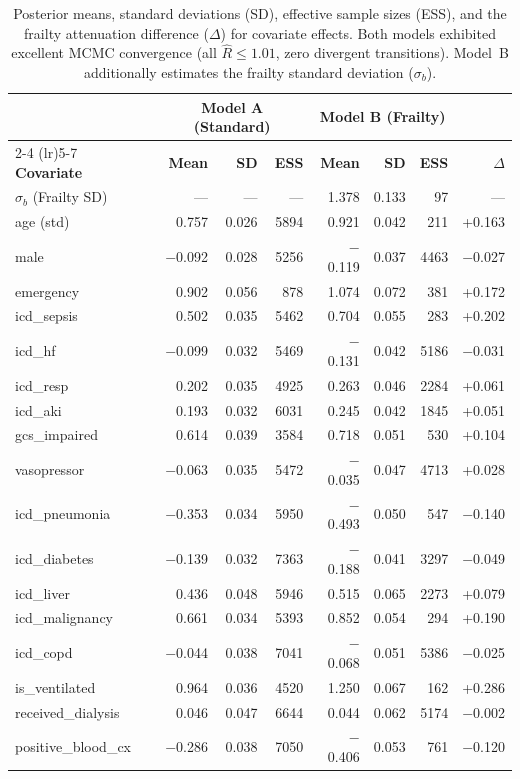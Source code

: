 \documentclass[twoside,11pt]{article}
\begin{document}
\begin{table}[ht!]
\centering
\scriptsize %
\setlength{\tabcolsep}{4pt} %
\renewcommand{\arraystretch}{0.95} %
\caption{Posterior means, standard deviations (SD), effective sample sizes (ESS), and the frailty attenuation difference ($\Delta$) for covariate effects. Both models exhibited excellent MCMC convergence (all $\hat{R} \le 1.01$, zero divergent transitions). Model~B additionally estimates the frailty standard deviation ($\sigma_b$).}
\label{tab:master_results}
\begin{tabular}{l rrr rrr r}
\toprule
 & \multicolumn{3}{c}{\textbf{Model A (Standard)}} & \multicolumn{3}{c}{\textbf{Model B (Frailty)}} & \\
\cmidrule(lr){2-4} \cmidrule(lr){5-7}
\textbf{Covariate} & \textbf{Mean} & \textbf{SD} & \textbf{ESS} & \textbf{Mean} & \textbf{SD} & \textbf{ESS} & \textbf{$\Delta$} \\
\midrule
$\sigma_b$ (Frailty SD) & --- & --- & --- & 1.378 & 0.133 & 97 & ---\\[2pt]
\midrule
age (std) & 0.757 & 0.026 & 5894 & 0.921 & 0.042 & 211 & +0.163 \\
male & $-$0.092 & 0.028 & 5256 & $-$0.119 & 0.037 & 4463 & $-$0.027 \\
emergency & 0.902 & 0.056 & 878 & 1.074 & 0.072 & 381 & +0.172 \\
icd\_sepsis & 0.502 & 0.035 & 5462 & 0.704 & 0.055 & 283 & +0.202 \\
icd\_hf & $-$0.099 & 0.032 & 5469 & $-$0.131 & 0.042 & 5186 & $-$0.031 \\
icd\_resp & 0.202 & 0.035 & 4925 & 0.263 & 0.046 & 2284 & +0.061 \\
icd\_aki & 0.193 & 0.032 & 6031 & 0.245 & 0.042 & 1845 & +0.051 \\
gcs\_impaired & 0.614 & 0.039 & 3584 & 0.718 & 0.051 & 530 & +0.104 \\
vasopressor & $-$0.063 & 0.035 & 5472 & $-$0.035 & 0.047 & 4713 & +0.028 \\
icd\_pneumonia & $-$0.353 & 0.034 & 5950 & $-$0.493 & 0.050 & 547 & $-$0.140 \\
icd\_diabetes & $-$0.139 & 0.032 & 7363 & $-$0.188 & 0.041 & 3297 & $-$0.049 \\
icd\_liver & 0.436 & 0.048 & 5946 & 0.515 & 0.065 & 2273 & +0.079 \\
icd\_malignancy & 0.661 & 0.034 & 5393 & 0.852 & 0.054 & 294 & +0.190 \\
icd\_copd & $-$0.044 & 0.038 & 7041 & $-$0.068 & 0.051 & 5386 & $-$0.025 \\
is\_ventilated & 0.964 & 0.036 & 4520 & 1.250 & 0.067 & 162 & +0.286 \\
received\_dialysis & 0.046 & 0.047 & 6644 & 0.044 & 0.062 & 5174 & $-$0.002 \\
positive\_blood\_cx & $-$0.286 & 0.038 & 7050 & $-$0.406 & 0.053 & 761 & $-$0.120 \\
\bottomrule
\end{tabular}
\end{table}
\end{document}
